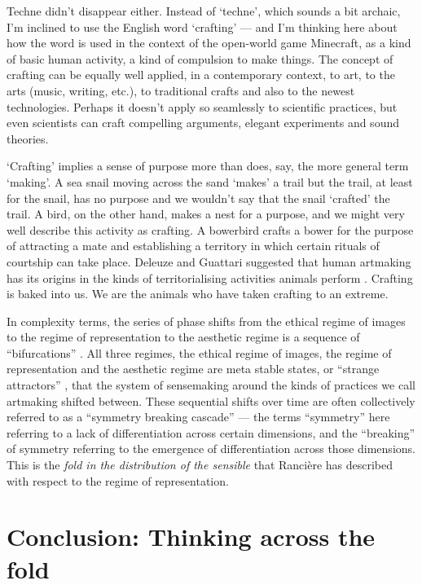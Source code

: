 \documentclass[letterpaper]{article}
\begin{document}
    Techne didn't disappear either. Instead of ‘techne’, which sounds a bit archaic, I'm inclined to use the English word ‘crafting’ — and I'm thinking here about how the word is used in the context of the open-world game Minecraft, as a kind of basic human activity, a kind of compulsion to make things. The concept of crafting can be equally well applied, in a contemporary context, to art, to the arts (music, writing, etc.), to traditional crafts and also to the newest technologies. Perhaps it doesn't apply so seamlessly to scientific practices, but even scientists can craft compelling arguments, elegant experiments and sound theories.

    ‘Crafting’ implies a sense of purpose more than does, say, the more general term ‘making’. A sea snail moving across the sand ‘makes’ a trail but the trail, at least for the snail, has no purpose and we wouldn't say that the snail ‘crafted’ the trail. A bird, on the other hand, makes a nest for a purpose, and we might very well describe this activity as crafting. A bowerbird crafts a bower for the purpose of attracting a mate and establishing a territory in which certain rituals of courtship can take place. Deleuze and Guattari suggested that human artmaking has its origins in the kinds of territorialising activities animals perform \citep[p.15]{GuattariChsmss1995}. Crafting is baked into us. We are the animals who have taken crafting to an extreme.
    
    In complexity terms, the series of phase shifts from the ethical regime of images to the regime of representation to the aesthetic regime is a sequence of “bifurcations” \citep{LandauThryOfPhstrnstns1936}. All three regimes, the ethical regime of images, the regime of representation and the aesthetic regime are meta stable states, or “strange attractors” \citep{RuelleTakensOnThNtrOfTrblnc1971}, that the system of sensemaking around the kinds of practices we call artmaking shifted between. These sequential shifts over time are often collectively referred to as a “symmetry breaking cascade” — the terms “symmetry” here referring to a lack of differentiation across certain dimensions, and the “breaking” of symmetry referring to the emergence of differentiation across those dimensions. This is the \emph{fold in the distribution of the sensible} that Rancière has described with respect to the regime of representation.

\section{Conclusion: Thinking across the fold}
\end{document}
